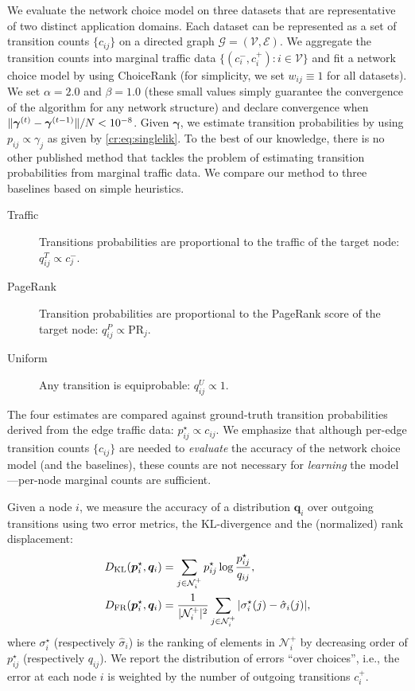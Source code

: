 We evaluate the network choice model on three datasets that are representative of two distinct application domains.
Each dataset can be represented as a set of transition counts $\{ c_{ij} \}$ on a directed graph $\mathcal{G} = (\mathcal{V}, \mathcal{E})$.
We aggregate the transition counts into marginal traffic data $\{ (c^-_i, c^+_i) : i \in \mathcal{V} \}$ and fit a network choice model by using ChoiceRank (for simplicity, we set $w_{ij} \equiv 1$ for all datasets).
We set $\alpha = 2.0$ and $\beta = 1.0$ (these small values simply guarantee the convergence of the algorithm for any network structure) and declare convergence when $\lVert\bm{\gamma}^{(t)} - \bm{\gamma}^{(t-1)}\rVert / N < 10^{-8}$.
Given $\bm{\gamma}$, we estimate transition probabilities by using $p_{ij} \propto \gamma_j$ as given by \eqref{cr:eq:singlelik}.
To the best of our knowledge, there is no other published method that tackles the problem of estimating transition probabilities from marginal traffic data.
We compare our method to three baselines based on simple heuristics.
\begin{description}
\item[Traffic] Transitions probabilities are proportional to the traffic of the target node: $q_{ij}^T \propto c_j^{-}$.
\item[PageRank] Transition probabilities are proportional to the PageRank score of the target node: $q_{ij}^P \propto \text{PR}_j$.
\item[Uniform] Any transition is equiprobable: $q_{ij}^U \propto 1$.
\end{description}
The four estimates are compared against ground-truth transition probabilities derived from the edge traffic data: $p_{ij}^\star \propto c_{ij}$.
We emphasize that although per-edge transition counts $\{c_{ij}\}$ are needed to \emph{evaluate} the accuracy of the network choice model (and the baselines), these counts are not necessary for \emph{learning} the model---per-node marginal counts are sufficient.

Given a node $i$, we measure the accuracy of a distribution $\bm{q}_i$ over outgoing transitions using two error metrics, the KL-divergence and the (normalized) rank displacement:
\begin{align*}
D_{\text{KL}}(\bm{p}_i^\star, \bm{q}_i) &= \sum_{j \in \mathcal{N}^+_i} p^\star_{ij} \log \frac{p^\star_{ij}}{q_{ij}}, \\
D_{\text{FR}}(\bm{p}_i^\star, \bm{q}_i) &= \frac{1}{\lvert\mathcal{N}^+_i\rvert^2} \sum_{j \in \mathcal{N}^+_i} \vert \sigma^\star_i(j) - \hat{\sigma}_i(j) \vert,
\end{align*}
where $\sigma^\star_i$ (respectively $\hat{\sigma}_i$) is the ranking of elements in $\mathcal{N}^+_i$ by decreasing order of $p^\star_{ij}$ (respectively $q_{ij}$).
We report the distribution of errors ``over choices'', i.e., the error at each node $i$ is weighted by the number of outgoing transitions $c^+_i$.


